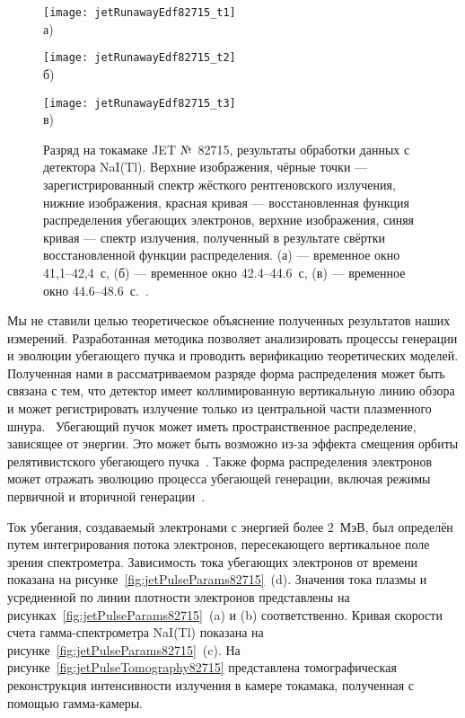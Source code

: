 \begin{figure}[ht]
    \begin{minipage}[b][][b]{0.42\linewidth}\centering
        \texttt{[image: jetRunawayEdf82715\_t1]} \\ а)
    \end{minipage}
    \hfill
    \begin{minipage}[b][][b]{0.42\linewidth}\centering
        \texttt{[image: jetRunawayEdf82715\_t2]} \\ б)
    \end{minipage}
    \hfill
    \begin{minipage}[b][][b]{0.42\linewidth}\centering
        \texttt{[image: jetRunawayEdf82715\_t3]} \\ в)
    \end{minipage}
    \caption{ Разряд на токамаке JET №~82715, результаты обработки данных с детектора NaI(Tl). Верхние изображения, чёрные точки --- зарегистрированный спектр жёсткого рентгеновского излучения, нижние изображения, красная кривая --- восстановленная функция распределения убегающих электронов, верхние изображения, синяя кривая --- спектр излучения, полученный в результате свёртки восстановленной функции распределения. (а) --- временное окно 41,1--42,4~с, (б) --- временное окно 42.4--44.6~с, (в) --- временное окно 44.6--48.6~с.~\cite{Shevelev2013}. }
    \label{fig:jetRunawayEdf82715}
\end{figure}



Мы не ставили целью теоретическое объяснение полученных результатов наших измерений. Разработанная методика позволяет анализировать процессы генерации и эволюции убегающего пучка и проводить верификацию теоретических моделей. Полученная нами в рассматриваемом разряде форма распределения может быть связана с тем, что детектор имеет коллимированную вертикальную линию обзора и может регистрировать излучение только из центральной части плазменного шнура.~\cite{Shevelev2013} Убегающий пучок может иметь пространственное распределение, зависящее от энергии. Это может быть возможно из-за эффекта смещения орбиты релятивистского убегающего пучка~\cite{Knoepfel1979}. Также форма распределения электронов может отражать эволюцию процесса убегающей генерации, включая режимы первичной и вторичной генерации~\cite{Helander2002}.

Ток убегания, создаваемый электронами с энергией более 2~МэВ, был определён путем интегрирования потока электронов, пересекающего вертикальное поле зрения спектрометра. Зависимость тока убегающих электронов от времени показана на рисунке~\ref{fig:jetPulseParams82715}~(d). Значения тока плазмы и усредненной по линии плотности электронов представлены на рисунках~\ref{fig:jetPulseParams82715}~(a) и (b) соответственно. Кривая скорости счета гамма-спектрометра NaI(Tl) показана на рисунке~\ref{fig:jetPulseParams82715}~(c). На рисунке~\ref{fig:jetPulseTomography82715} представлена томографическая реконструкция интенсивности излучения в камере токамака, полученная с помощью гамма-камеры.


